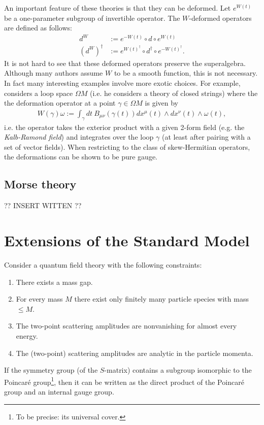     An important feature of these theories is that they can be deformed. Let $e^{W(t)}$ be a one-parameter subgroup of invertible operator. The $W$-deformed operators are defined as follows:
    \begin{align}
        d^W &:= e^{-W(t)}\circ d\circ e^{W(t)}\\
        (d^W)^\dagger &:= e^{W(t)^\dagger}\circ d^\dagger\circ e^{-W(t)^\dagger}.
    \end{align}
    It is not hard to see that these deformed operators preserve the superalgebra. Although many authors assume $W$ to be a smooth function, this is not necessary. In fact many interesting examples involve more exotic choices. For example, \cite{phd_schreiber} considers a loop space $\Omega M$ (i.e. he considers a theory of closed strings) where the the deformation operator at a point $\gamma\in\Omega M$ is given by
    \begin{gather}
        W(\gamma)\omega := \int_\gamma dt\ B_{\mu\nu}(\gamma(t))dx^\mu(t)\wedge dx^\nu(t)\wedge\omega(t),
    \end{gather}
    i.e. the operator takes the exterior product with a given 2-form field (e.g. the \textit{Kalb-Ramond field}) and integrates over the loop $\gamma$ (at least after pairing with a set of vector fields). When restricting to the class of skew-Hermitian operators, the deformations can be shown to be pure gauge.

\subsection{Morse theory}

    ?? INSERT WITTEN ??

\section{Extensions of the Standard Model}

    \begin{theorem}
        Consider a quantum field theory with the following constraints:
        \begin{enumerate}
            \item There exists a mass gap.
            \item For every mass $M$ there exist only finitely many particle species with mass $\leq M$.
            \item The two-point scattering amplitudes are nonvanishing for almost every energy.
            \item The (two-point) scattering amplitudes are analytic in the particle momenta.
        \end{enumerate}
        If the symmetry group (of the $S$-matrix) contains a subgroup isomorphic to the Poincar\'e group\footnote{To be precise: its universal cover.}, then it can be written as the direct product of the Poincar\'e group and an internal gauge group.
    \end{theorem}

